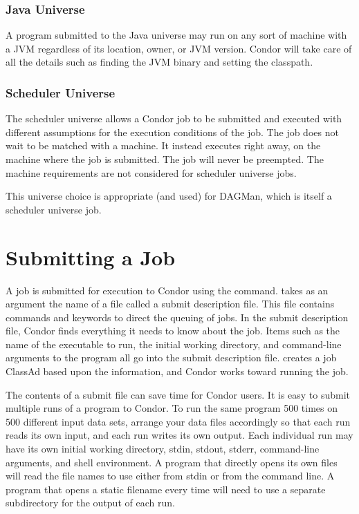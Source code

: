 \subsubsection{Java Universe}


A program submitted to the Java universe may run on any sort of machine
with a JVM regardless of its location, owner, or JVM version.  Condor
will take care of all the details such as finding the JVM binary and
setting the classpath.

\subsubsection{Scheduler Universe}

The scheduler universe allows a Condor job to be submitted and
executed with different assumptions for the execution conditions
of the job.
The job does not wait to be matched with a machine.
It instead executes right away, on the machine where the job
is submitted.
The job will never be preempted.
The machine requirements are not considered for scheduler universe
jobs.

This universe choice is appropriate (and used) for DAGMan,
which is itself a scheduler universe job.

\section{Submitting a Job}

A job is submitted for execution to Condor using the
 command.
 takes as an argument the name of a
file called a submit description file.
This file contains commands and keywords to direct the queuing of jobs.
In the submit description file, Condor finds everything it needs
to know about the job.  Items such as the name of the executable to run,
the initial working directory, and command-line arguments to the
program all go into
the submit description file.   creates a job
ClassAd based upon the information,
and Condor
works toward running the job.

The contents of a submit file
can save time for Condor users.
It is easy to submit multiple runs of a program to
Condor. To run the same program 500 times on 500
different input data sets, arrange your data files
accordingly so that each run reads its own input, and each run
writes its own output.
Each individual run may have its own initial
working directory, stdin, stdout, stderr, command-line arguments, and
shell environment.
A program that directly opens its own
files will read the file names to use either from stdin
or from the command line. 
A program that opens a static filename every time
will need to use a separate subdirectory for the output of each run.

